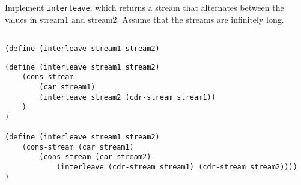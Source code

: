 \begin{blocksection}
\question Implement \lstinline$interleave$, which returns a stream that alternates between the values in stream1 and stream2.
Assume that the streams are infinitely long.

\ifprintanswers\else
\begin{lstlisting}

(define (interleave stream1 stream2)
\end{lstlisting}
\fi

\begin{solution}[1in]
\begin{lstlisting}
(define (interleave stream1 stream2)
    (cons-stream
        (car stream1)
        (interleave stream2 (cdr-stream stream1))
    )
)

(define (interleave stream1 stream2)
    (cons-stream (car stream1)
        (cons-stream (car stream2)
            (interleave (cdr-stream stream1) (cdr-stream stream2))))
)
\end{lstlisting}
\end{solution}
\end{blocksection}
